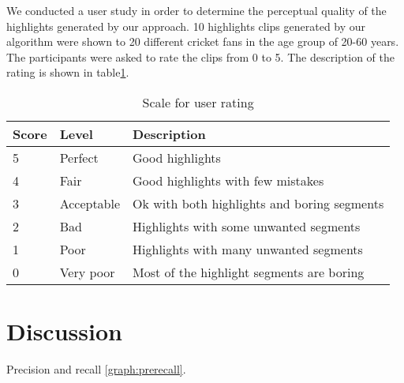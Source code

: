 We conducted a user study in order to determine the perceptual quality of the highlights generated by our approach. 10 highlights clips generated by our algorithm were shown to 20 different cricket fans in the age group of 20-60 years. The participants were asked to rate the clips from 0 to 5. The description of the rating is shown in table\ref{tab:userdescription}.
\begin{table}[ht]
\caption{Scale for user rating} %
\centering 
\begin{tabular}{lll} 
\hline
Score & Level  & Description \\ [0.5ex] %
\hline
5 & Perfect &  Good highlights  \\
4 & Fair &  Good highlights with few mistakes \\
3 & Acceptable &  Ok with both highlights and boring segments\\
2 & Bad &   Highlights with some unwanted segments \\
1 & Poor &  Highlights with many unwanted segments \\
0 & Very poor & Most of the highlight segments are boring\\[1ex]
\hline 
\end{tabular}
\label{tab:userdescription}
\end{table}

\section{Discussion}
Precision and recall \ref{graph:prerecall}.\\
\newline
{}

